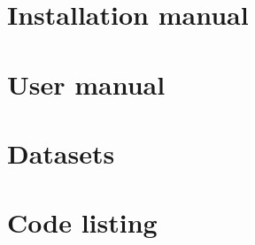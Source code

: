 \documentclass{ucl_thesis}
\begin{document}








\cleardoublepage
\appendix
\chapter{Installation manual}  \label{app:install}
\chapter{User manual}  \label{app:usage}
\chapter{Datasets}  \label{app:datasets}
\chapter{Code listing}  \label{app:code}
\end{document}
